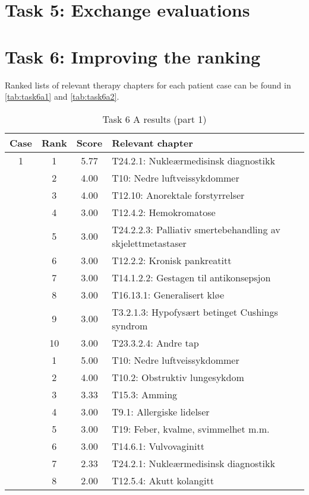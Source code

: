 \section{Task 5: Exchange evaluations}


\section{Task 6: Improving the ranking}
Ranked lists of relevant therapy chapters for each patient case can be found
in \autoref{tab:task6a1} and \autoref{tab:task6a2}.
\begin{table}[htbp] \footnotesize \center
\caption{Task 6 A results (part 1)\label{tab:task6a1}}
\begin{tabular}{c c c l}
    \toprule
    Case & Rank & Score & Relevant chapter \\
    \midrule
    1 & 1 & 5.77 & T24.2.1: Nukleærmedisinsk diagnostikk \\
     & 2 & 4.00 & T10: Nedre luftveissykdommer \\
     & 3 & 4.00 & T12.10: Anorektale forstyrrelser \\
     & 4 & 3.00 & T12.4.2: Hemokromatose \\
     & 5 & 3.00 & T24.2.2.3: Palliativ smertebehandling av skjelettmetastaser \\
     & 6 & 3.00 & T12.2.2: Kronisk pankreatitt \\
     & 7 & 3.00 & T14.1.2.2: Gestagen til antikonsepsjon \\
     & 8 & 3.00 & T16.13.1: Generalisert kløe \\
     & 9 & 3.00 & T3.2.1.3: Hypofysært betinget Cushings syndrom \\
     & 10 & 3.00 & T23.3.2.4: Andre tap \\
	\addlinespace
    2 & 1 & 5.00 & T10: Nedre luftveissykdommer \\
     & 2 & 4.00 & T10.2: Obstruktiv lungesykdom \\
     & 3 & 3.33 & T15.3: Amming \\
     & 4 & 3.00 & T9.1: Allergiske lidelser \\
     & 5 & 3.00 & T19: Feber, kvalme, svimmelhet m.m. \\
     & 6 & 3.00 & T14.6.1: Vulvovaginitt \\
     & 7 & 2.33 & T24.2.1: Nukleærmedisinsk diagnostikk \\
     & 8 & 2.00 & T12.5.4: Akutt kolangitt \\

\end{tabular}
\end{table}
